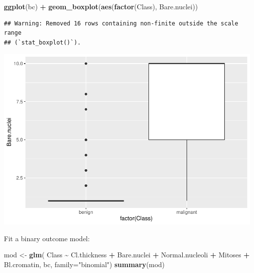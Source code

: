\documentclass[
]{book}
\newenvironment{Shaded}{\begin{snugshade}}{\end{snugshade}}
\newcommand{\AttributeTok}[1]{\textcolor[rgb]{0.13,0.29,0.53}{#1}}
\newcommand{\FunctionTok}[1]{\textcolor[rgb]{0.13,0.29,0.53}{\textbf{#1}}}
\newcommand{\NormalTok}[1]{#1}
\newcommand{\OtherTok}[1]{\textcolor[rgb]{0.56,0.35,0.01}{#1}}
\newcommand{\SpecialCharTok}[1]{\textcolor[rgb]{0.81,0.36,0.00}{\textbf{#1}}}
\newcommand{\StringTok}[1]{\textcolor[rgb]{0.31,0.60,0.02}{#1}}
\begin{document}
\begin{Shaded}
\begin{Highlighting}[]
\FunctionTok{ggplot}\NormalTok{(bc) }\SpecialCharTok{+} \FunctionTok{geom\_boxplot}\NormalTok{(}\FunctionTok{aes}\NormalTok{(}\FunctionTok{factor}\NormalTok{(Class), Bare.nuclei))}
\end{Highlighting}
\end{Shaded}

\begin{verbatim}
## Warning: Removed 16 rows containing non-finite outside the scale range
## (`stat_boxplot()`).
\end{verbatim}

\includegraphics{_main_files/figure-latex/unnamed-chunk-84-1.pdf}

Fit a binary outcome model:

\begin{Shaded}
\begin{Highlighting}[]
\NormalTok{mod }\OtherTok{\textless{}{-}} \FunctionTok{glm}\NormalTok{(}
\NormalTok{    Class }\SpecialCharTok{\textasciitilde{}}\NormalTok{ Cl.thickness }\SpecialCharTok{+}\NormalTok{ Bare.nuclei }\SpecialCharTok{+}\NormalTok{ Normal.nucleoli }\SpecialCharTok{+}\NormalTok{ Mitoses }\SpecialCharTok{+}\NormalTok{ Bl.cromatin, }
\NormalTok{    bc,}
    \AttributeTok{family=}\StringTok{"binomial"}\NormalTok{)}
\FunctionTok{summary}\NormalTok{(mod)}
\end{Highlighting}
\end{Shaded}
\end{document}
